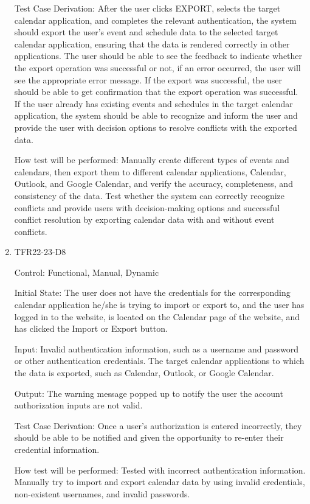 \documentclass[12pt, titlepage]{article}
\begin{document}
\begin{enumerate}
Test Case Derivation: After the user clicks EXPORT, selects the target calendar application, and completes the relevant authentication, the system should export the user's event and schedule data to the selected target calendar application, ensuring that the data is rendered correctly in other applications. The user should be able to see the feedback to indicate whether the export operation was successful or not, if an error occurred, the user will see the appropriate error message. If the export was successful, the user should be able to get confirmation that the export operation was successful. If the user already has existing events and schedules in the target calendar application, the system should be able to recognize and inform the user and provide the user with decision options to resolve conflicts with the exported data.
					
How test will be performed: Manually create different types of events and calendars, then export them to different calendar applications, Calendar, Outlook, and Google Calendar, and verify the accuracy, completeness, and consistency of the data. Test whether the system can correctly recognize conflicts and provide users with decision-making options and successful conflict resolution by exporting calendar data with and without event conflicts. 

\item{TFR22-23-D8\\}

Control: Functional, Manual, Dynamic
					
Initial State: The user does not have the credentials for the corresponding calendar application he/she is trying to import or export to, and the user has logged in to the website, is located on the Calendar page of the website, and has clicked the Import or Export button.
					
Input: Invalid authentication information, such as a username and password or other authentication credentials. The target calendar applications to which the data is exported, such as Calendar, Outlook, or Google Calendar.
					
Output: The warning message popped up to notify the user the account authorization inputs are not valid.

Test Case Derivation: Once a user's authorization is entered incorrectly, they should be able to be notified and given the opportunity to re-enter their credential information.
					
How test will be performed: Tested with incorrect authentication information. Manually try to import and export calendar data by using invalid credentials, non-existent usernames, and invalid passwords.


\end{enumerate}
\end{document}
